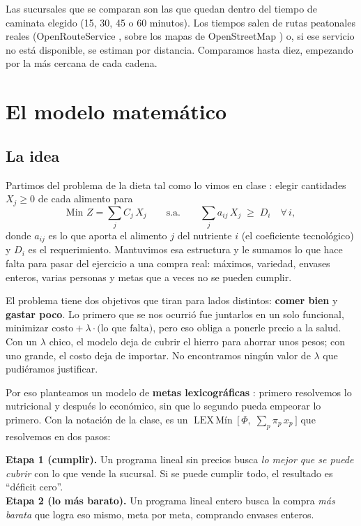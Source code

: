 \documentclass[10pt,a4paper]{article}
\newcommand{\idea}[1]{\par\smallskip\noindent\colorbox{suave}{\parbox{\dimexpr\linewidth-2\fboxsep}{\small #1}}\par\smallskip}
\begin{document}
Las sucursales que se comparan son las que quedan dentro del tiempo de caminata
elegido (15, 30, 45 o 60 minutos). Los tiempos salen de rutas peatonales reales
(OpenRouteService \cite{ors}, sobre los mapas de OpenStreetMap \cite{osm}) o, si ese
servicio no está disponible, se estiman por distancia. Comparamos hasta diez,
empezando por la más cercana de cada cadena.

\section{El modelo matemático}
\label{sec:modelo}

\subsection{La idea}
\label{sec:idea}

Partimos del problema de la dieta tal como lo vimos en clase
\cite{clase-formulacion}: elegir cantidades $X_j \geq 0$ de cada alimento para
\[
\text{Min } Z = \sum_j C_j\, X_j \qquad \text{s.a.} \qquad \sum_j a_{ij}\, X_j \;\geq\; D_i \quad \forall\, i,
\]
donde $a_{ij}$ es lo que aporta el alimento $j$ del nutriente $i$ (el coeficiente
tecnológico) y $D_i$ es el requerimiento. Mantuvimos esa estructura y le sumamos lo
que hace falta para pasar del ejercicio a una compra real: máximos, variedad,
envases enteros, varias personas y metas que a veces no se pueden cumplir.

El problema tiene dos objetivos que tiran para lados distintos: \textbf{comer bien}
y \textbf{gastar poco}. Lo primero que se nos ocurrió fue juntarlos en un solo
funcional, minimizar $\text{costo} + \lambda \cdot \text{(lo que falta)}$, pero eso
obliga a ponerle precio a la salud. Con un $\lambda$ chico, el modelo deja de cubrir
el hierro para ahorrar unos pesos; con uno grande, el costo deja de importar. No
encontramos ningún valor de $\lambda$ que pudiéramos justificar.

Por eso planteamos un modelo de \textbf{metas lexicográficas}
\cite{clase-metas,hillier}: primero resolvemos lo nutricional y después lo
económico, sin que lo segundo pueda empeorar lo primero. Con la notación de la
clase, es un $\operatorname{LEX\,Mín}\,\bigl[\,\Phi,\; \sum_p \pi_p\, x_p\,\bigr]$
que resolvemos en dos pasos:

\idea{\textbf{Etapa 1 (cumplir).} Un programa lineal sin precios busca \emph{lo mejor
que se puede cubrir} con lo que vende la sucursal. Si se puede cumplir todo, el
resultado es ``déficit cero''.\\[2pt]
\textbf{Etapa 2 (lo más barato).} Un programa lineal entero busca la compra \emph{más
barata} que logra eso mismo, meta por meta, comprando envases enteros.}
\end{document}
